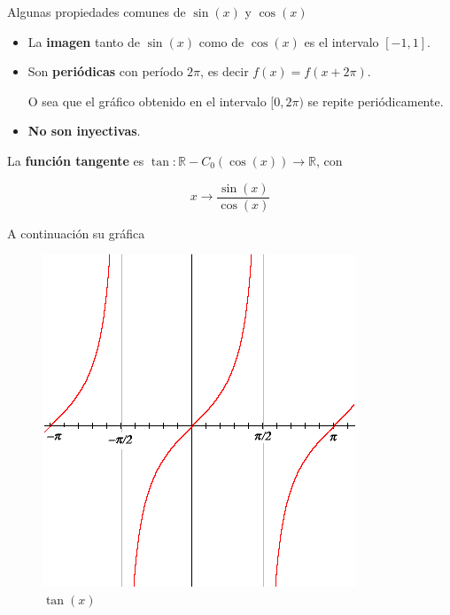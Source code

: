 \begin{property}
Algunas propiedades comunes de $\sin(x)$ y $\cos(x)$

\begin{itemize}
\item La \textbf{imagen} tanto de $\sin(x)$ como de $\cos(x)$ es el intervalo $[-1,1]$.
	
\item Son \textbf{periódicas} con período $2\pi$, es decir $f(x) = f(x + 2\pi)$.  
	
O sea que el gráfico obtenido en el intervalo $[0, 2\pi)$ se repite periódicamente.
	
\item \textbf{No son inyectivas}.
\end{itemize}
\end{property}

\begin{definition}[Tangente] 
La \textbf{función tangente} es $\tan : \mathbb{R} - C_0(\cos(x)) \to \mathbb{R}$, con 

$$ x \to \frac{\sin(x)}{\cos(x)} $$

A continuación su gráfica 
\end{definition}

\begin{figure}[h]
\centering\includegraphics[scale=0.5]{images/01_precalculo/tan.png}
\caption{$\tan(x)$}
\end{figure}

